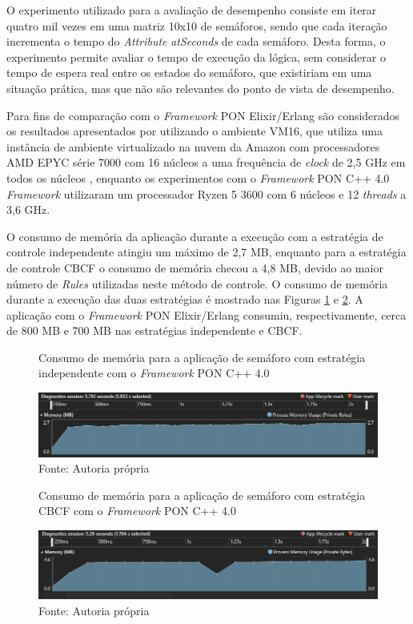 \FloatBarrier

O experimento utilizado para a avaliação de desempenho consiste em iterar quatro
mil vezes em uma matriz 10x10 de semáforos, sendo que cada iteração incrementa o
tempo do \textit{Attribute} \textit{atSeconds} de cada semáforo. Desta forma, o
experimento permite avaliar o tempo de execução da lógica, sem considerar o
tempo de espera real entre os estados do semáforo, que existiriam em uma
situação prática, mas que não são relevantes do ponto de vista de desempenho.

Para fins de comparação com o \textit{Framework} PON Elixir/Erlang são
considerados os resultados apresentados por 
utilizando o ambiente VM16, que utiliza uma instância de ambiente virtualizado
na nuvem da Amazon com processadores AMD EPYC série 7000 com 16 núcleos a uma
frequência de \textit{clock} de 2,5 GHz em todos os núcleos
\cite{msc_negrini_2019}, enquanto os experimentos com o \textit{Framework} PON
C++ 4.0 \textit{Framework} utilizaram um processador Ryzen 5 3600 com 6 núcleos
e 12 \textit{threads} a 3,6 GHz.

\FloatBarrier

O consumo de memória da aplicação durante a execução com a estratégia de
controle independente atingiu um máximo de 2,7 MB, enquanto para a estratégia de
controle CBCF o consumo de memória checou a 4,8 MB, devido ao maior número de
\textit{Rules} utilizadas neste método de controle. O consumo de memória durante
a execução das duas estratégias é mostrado nas Figuras \ref{fig:mem_cta} e
\ref{fig:mem_cbcf}. A aplicação com o \textit{Framework} PON Elixir/Erlang
consumiu, respectivamente, cerca de 800 MB e 700 MB nas estratégias independente
e CBCF.

\begin{figure}[!htb]
\centering
\caption{Consumo de memória para a aplicação de semáforo com estratégia
independente com o \textit{Framework} PON C++ 4.0}
\smallskip
\includegraphics[width=\textwidth]{../figures/cta_mem.png}
\caption*{Fonte: Autoria própria}
\label{fig:mem_cta}
\end{figure}

\begin{figure}[!htb]
\centering
\caption{Consumo de memória para a aplicação de semáforo com estratégia CBCF com
o \textit{Framework} PON C++ 4.0}
\smallskip
\includegraphics[width=\textwidth]{../figures/cbcl_mem.png}
\caption*{Fonte: Autoria própria}
\label{fig:mem_cbcf}
\end{figure}

